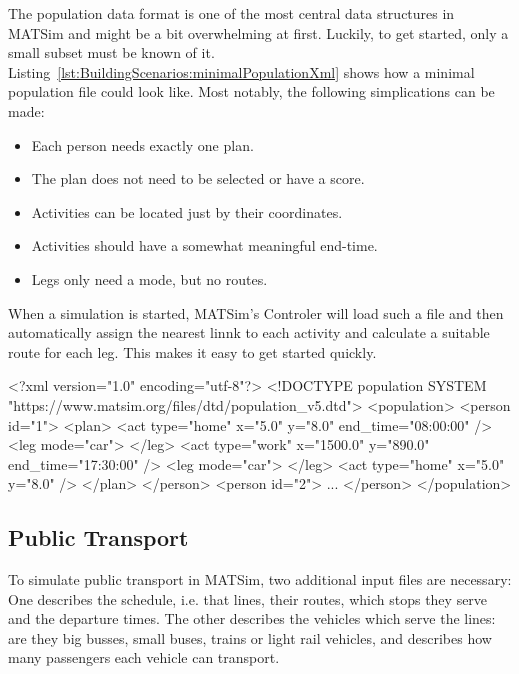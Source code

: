 \bigskip

The population data format is one of the most central data structures in
MATSim and might be a bit overwhelming at first. Luckily, to get started, only a
small subset must be known of it.
Listing~\ref{lst:BuildingScenarios:minimalPopulationXml} shows how a minimal
population file could look like. Most notably, the following simplications can
be made:
\begin{itemize}\styleItemize
  \item Each person needs exactly one plan.
  \item The plan does not need to be selected or have a score.
  \item Activities can be located just by their coordinates.
  \item Activities should have a somewhat meaningful end-time.
  \item Legs only need a mode, but no routes.
\end{itemize}
When a simulation is started, MATSim's Controler will load such a file and then
automatically assign the nearest linnk to each activity and calculate a suitable
route for each leg. This makes it easy to get started quickly.

\begin{xml-file}[caption=Minimal population.xml required to start MATSim,
label=lst:BuildingScenarios:minimalPopulationXml]
<?xml version="1.0" encoding="utf-8"?>
<!DOCTYPE population SYSTEM "https://www.matsim.org/files/dtd/population_v5.dtd">
<population>
	<person id="1">
		<plan>
			<act type="home" x="5.0" y="8.0" end_time="08:00:00" />
			<leg mode="car">
			</leg>
			<act type="work" x="1500.0" y="890.0" end_time="17:30:00" />
			<leg mode="car">
			</leg>
			<act type="home" x="5.0" y="8.0" />
		</plan>
	</person>
	<person id="2">
		...
	</person>
</population>
\end{xml-file}


\subsection{Public Transport}

To simulate public transport in MATSim, two additional input files are
necessary: One describes the schedule, i.e. that lines, their routes, which
stops they serve and the departure times. The other describes the vehicles which
serve the lines: are they big busses, small buses, trains or light rail
vehicles, and describes how many passengers each vehicle can transport.

